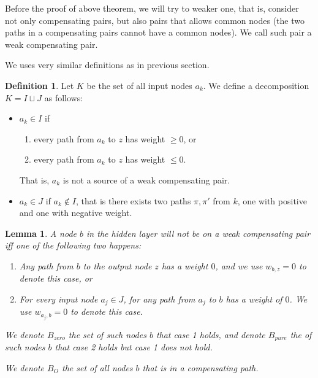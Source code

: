 \documentclass[]{article}
\newtheorem{lemma}{Lemma}
\theoremstyle{definition}
\newtheorem{definition}{Definition}
\begin{document}
Before the proof of above theorem, we will try to weaker one, that is, consider not only compensating pairs, but also pairs that allows common nodes (the two paths in a compensating pairs cannot have a common nodes). We call such pair a weak compensating pair.

We uses very similar definitions as in previous section.

\begin{definition}
	Let $K$ be the set of  all input nodes $a_k$. 
	We define a decomposition $K=I\sqcup J$ as follows:  
	\begin{itemize}
		\item $a_k \in I$  if
		\begin{enumerate}
			\item every path from $a_k$ to $z$ has weight $\geq 0$, or
			\item every path from $a_k$ to $z$ has weight $\leq 0$.
		\end{enumerate}
		That is, $a_k$ is not a source of a weak compensating pair.
		\item $a_k \in J$ if $a_k \notin I$, that is there exists two paths $\pi,\pi'$ from $k$, 
		one with positive and one with negative weight.
	\end{itemize}
\end{definition} 



\begin{lemma} \label{lem:open_node_2}
	A node $b$ in the hidden layer will not be on a weak compensating pair iff one of the following two happens:
	\begin{enumerate}
		\item Any path from $b$ to the output node $z$ has a weight $0$, and we use $w_{b,z}=0$ to denote this case, or
		\item For every input node $a_j\in J$, for any path from $a_j$ to $b$ has a weight of $0$. We use $w_{a_j,b}=0$ to denote this case.
	\end{enumerate}
	We denote $B_{zero}$ the set of such nodes $b$ that case 1 holds, and denote $B_{pure}$ the of such nodes $b$ that case 2 holds but case 1 does not hold.
	
	We denote $B_O$ the set of all nodes $b$ that is in a compensating path.
\end{lemma}
\end{document}

